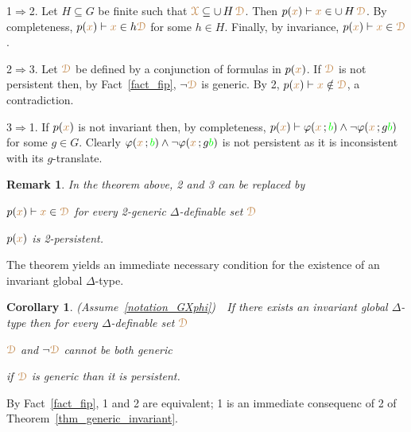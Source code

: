\documentclass[10pt,openany]{amsproc}
\makeatletter
\newcommand{\mylabel}[1]{{\ssf{#1}}\hfill}
\renewenvironment{itemize}
  {\begin{list}{}{%
   \setlength{\parskip}{0mm}
   \setlength{\topsep}{.2\baselineskip}
   \setlength{\rightmargin}{0mm}
   \setlength{\listparindent}{0mm}
   \setlength{\itemindent}{0mm}
   \setlength{\labelwidth}{2ex}
   \setlength{\itemsep}{.1\baselineskip}
   \setlength{\parsep}{0mm}
   \setlength{\partopsep}{0mm}
   \setlength{\labelsep}{1ex}
   \setlength{\leftmargin}{\labelwidth+\labelsep}
   \let\makelabel\mylabel
   }}
   {\vspace*{-.3\baselineskip}\end{list}}
\def\proves{\vdash}
\def\IMP{\Rightarrow}
\def\D{\EuScript D}
\def\X{\EuScript X}
\def\theta{\vartheta}
\def\phi{\varphi}
\def\ssf#1{\textsf{\small #1}}
\newcounter{thm}
\theoremstyle{mio}
\newtheorem{corollary}[thm]{Corollary}\tcolorboxenvironment{corollary}{mythm}
\newtheorem{remark}[thm]{Remark}\tcolorboxenvironment{remark}{mythm}
\providecommand{\proofNameStyle}{\bfseries}
\renewenvironment{proof}[1][\proofname]{\par
  \pushQED{\qed}%
  \normalfont%
  \trivlist
  \item[\hskip\labelsep
        \proofNameStyle
    #1\@addpunct{.}]\ignorespaces
}{%
  \popQED\endtrivlist\@endpefalse
}
\def\mr{\color{brown}}
\def\gr{\color{green}}
\def\mrD{{\mr\D}}
\def\mrX{{\mr\X}}
\makeatother
\begin{document}
\begin{proof}
  \ssf1$\IMP$\ssf2.
  Let $H\subseteq G$ be finite such that $\mrX\subseteq\cup\,H\,\mrD$.
  Then $p({\mr x})\proves {\mr x}\in\cup\,H\,\mrD$.
  By completeness, $p({\mr x})\proves {\mr x}\in h\mrD$ for some $h\in H$.
  Finally, by invariance,  $p({\mr x})\proves{\mr x}\in\mrD$.
  
  \ssf2$\IMP$\ssf3.
  Let $\mrD$ be defined by a conjunction of formulas in $p({\mr x})$.
  If $\mrD$ is not persistent then, by Fact~\ref{fact_fip}, $\neg\mrD$ is generic. 
  By \ssf2, $p({\mr x})\proves{\mr x}\notin\mrD$, a contradiction.

  \ssf3$\IMP$\ssf1.
  If $p({\mr x})$ is not invariant then, by completeness, $p({\mr x})\proves\phi({\mr x}\,;{\gr b})\wedge\neg\phi({\mr x}\,;g{\gr b})$ for some $g\in G$.
  Clearly $\phi({\mr x}\,;{\gr b})\wedge\neg\phi({\mr x}\,;g{\gr b})$ is not persistent as it is inconsistent with its $g$-translate.
\end{proof}

\begin{remark}
  In the theorem above, \ssf2 and \ssf3 can be replaced by
  \begin{itemize}
    \item[2$'$\!.] $p({\mr x})\proves{\mr x}\in\mrD$ for every 2-generic $\Delta$-definable set $\mrD$
    \item[3$'$\!.] $p({\mr x})$ is 2-persistent.
  \end{itemize}
\end{remark}

The theorem yields an immediate necessary condition for the existence of an invariant global $\Delta$-type.

\begin{corollary}
  (Assume~\ref{notation_GXphi})\ \  
  If there exists an invariant global $\Delta$-type then for every $\Delta$-definable set $\mrD$
  \begin{itemize}
    \item[1.] $\mrD$ and $\neg\mrD$ cannot be both generic
    \item[2.] if $\mrD$ is generic than it is persistent.
  \end{itemize}
\end{corollary}

\begin{proof}
  By Fact~\ref{fact_fip}, \ssf1 and \ssf2 are equivalent; \ssf1 is an immediate consequenc of \ssf2 of Theorem~\ref{thm_generic_invariant}.
\end{proof}
\end{document}
